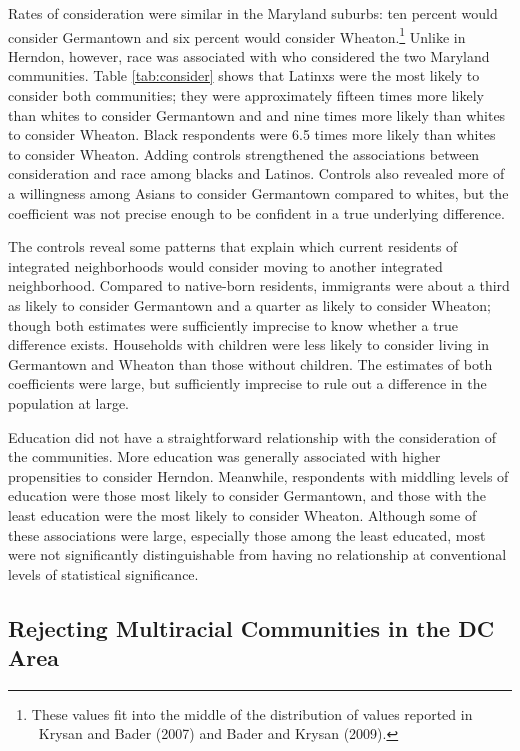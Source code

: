 \documentclass{baderart}
\newcommand{\TK}[1][]{\strong{TK #1}}
\begin{document}

Rates of consideration were similar in the Maryland suburbs: ten percent would consider Germantown and six percent would consider Wheaton.\footnote{These values fit into the middle of the distribution of values reported in \TK\ Krysan and Bader (2007) and Bader and Krysan (2009).} Unlike in Herndon, however, race was associated with who considered the two Maryland communities. Table \ref{tab:consider} shows that Latinxs were the most likely to consider both communities; they were approximately fifteen times more likely than whites to consider Germantown and and nine times more likely than whites to consider Wheaton. Black respondents were 6.5 times more likely than whites to consider Wheaton. Adding controls strengthened the associations between consideration and race among blacks and Latinos. Controls also revealed more of a willingness among Asians to consider Germantown compared to whites, but the coefficient was not precise enough to be confident in a true underlying difference. 

The controls reveal some patterns that explain which current residents of integrated neighborhoods would consider moving to another integrated neighborhood. Compared to native-born residents, immigrants were about a third as likely to consider Germantown and a quarter as likely to consider Wheaton; though both estimates were sufficiently imprecise to know whether a true difference exists. Households with children were less likely to consider living in Germantown and Wheaton than those without children. The estimates of both coefficients were large, but sufficiently imprecise to rule out a difference in the population at large. 

Education did not have a straightforward relationship with the consideration of the communities. More education was generally associated with higher propensities to consider Herndon. Meanwhile, respondents with middling levels of education were those most likely to consider Germantown, and those with the least education were the most likely to consider Wheaton. Although some of these associations were large, especially those among the least educated, most were not significantly distinguishable from having no relationship at conventional levels of statistical significance. 

\subsection{Rejecting Multiracial Communities in the DC Area}\label{ssec:reject}
\end{document}
